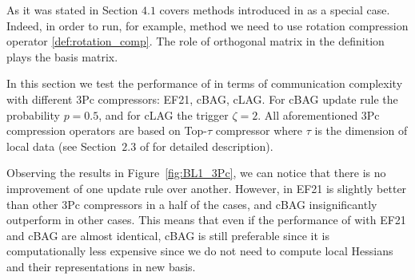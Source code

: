 \documentclass[11pt]{article}
\begin{document}
	As it was stated in Section $4.1$  covers methods introduced in \citep{qian2021basis} as a special case. Indeed, in order to run, for example,  method we need to use rotation compression operator \ref{def:rotation_comp}. The role of orthogonal matrix in the definition plays the basis matrix. 
	
	In this section we test the performance of  in terms of communication complexity with different 3Pc compressors: EF21, cBAG, cLAG. For cBAG update rule the probability $p=0.5$, and for cLAG the trigger $\zeta=2$. All aforementioned 3Pc compression operators are based on Top-$\tau$ compressor where $\tau$ is the dimension of local data (see Section~$2.3$ of \citep{qian2021basis} for detailed description).
	
	Observing the results in Figure~\ref{fig:BL1_3Pc}, we can notice that there is no improvement of one update rule over another. However, in EF21 is slightly better than other 3Pc compressors in a half of the cases, and cBAG insignificantly outperform in other cases. This means that even if the performance of  with EF21 and cBAG are almost identical, cBAG is still preferable since it is computationally less expensive since we do not need to compute local Hessians and their representations in new basis.
	
\end{document}
